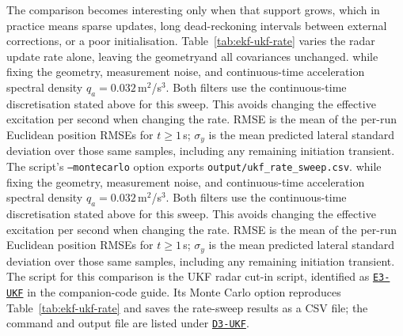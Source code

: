 \documentclass[graybox,envcountchap]{style/SNmono}
\newcommand{\repopath}[1]{\texttt{#1}}
\providecommand{\DIFadd}[1]{{\protect\color{blue} #1}} %
\providecommand{\DIFdel}[1]{{\protect\color{red} #1}} %
\providecommand{\DIFaddbegin}{} %
\providecommand{\DIFaddend}{} %
\providecommand{\DIFdelbegin}{} %
\providecommand{\DIFdelend}{} %
\DeclareRobustCommand{\RtwoDel}[1]{{\color{red}%
  \renewcommand{\DIFadd}[1]{##1}\renewcommand{\DIFdel}[1]{##1}%
  #1}}
\DeclareRobustCommand{\RtwoAdd}[1]{{\color{blue}#1}}
\DeclareRobustCommand{\codeentry}[1]{\hyperref[code:#1]{\texttt{#1}}}
\begin{document}
\begin{example}
The comparison becomes interesting only when that support grows, which in
practice means sparse updates, long dead-reckoning intervals between external
corrections, or a poor initialisation. Table~\ref{tab:ekf-ukf-rate} varies the
radar update rate \DIFdelbegin \DIFdel{alone, leaving the geometryand all covariances unchanged. }\DIFdelend \DIFaddbegin \RtwoDel{\DIFadd{while fixing the geometry, measurement noise, and continuous-time acceleration spectral density $q_a=0.032$\,m$^2$/s$^3$. Both filters use the continuous-time discretisation stated above for this sweep. This avoids changing the effective excitation per second when changing the rate. RMSE is the mean of the per-run Euclidean position RMSEs for $t\ge1$\,s; $\sigma_y$ is the mean predicted lateral standard deviation over those same samples, including any remaining initiation transient. The script's }\texttt{\DIFadd{--montecarlo}} \DIFadd{option exports \repopath{output/ukf\_rate\_sweep.csv}.
}}\RtwoAdd{while fixing the geometry, measurement noise, and continuous-time acceleration spectral density $q_a=0.032$\,m$^2$/s$^3$. Both filters use the continuous-time discretisation stated above for this sweep. This avoids changing the effective excitation per second when changing the rate. RMSE is the mean of the per-run Euclidean position RMSEs for $t\ge1$\,s; $\sigma_y$ is the mean predicted lateral standard deviation over those same samples, including any remaining initiation transient. The script for this comparison is the UKF radar cut-in script, identified as \codeentry{E3-UKF} in the companion-code guide. Its Monte Carlo option reproduces Table~\ref{tab:ekf-ukf-rate} and saves the rate-sweep results as a CSV file; the command and output file are listed under \codeentry{D3-UKF}.}\DIFaddend 


\end{example}
\end{document}
